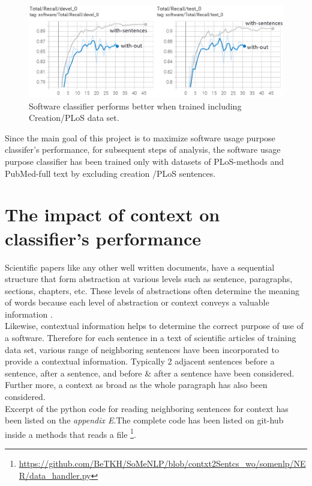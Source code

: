\begin{figure}[htbp]
	\centering
	\includegraphics[width=.90\textwidth]{4.graphics/figures/ch_6/1.with_sent_vs_without/HD/2}
	\caption{Software classifier performs better when trained including Creation/PLoS data set.}
	\label{fig:chapter06:with}
\end{figure}

Since the main goal of this project is to maximize software usage purpose classifer’s performance, for subsequent steps of analysis, the software usage purpose classifier has been trained only with datasets of PLoS-methods and PubMed-full text by excluding creation /PLoS sentences. 

\section{The impact of context on classifier’s performance }
\label{sec:chapter06:context}

Scientific papers like any other well written documents, have a sequential structure that form abstraction at various levels such as sentence, paragraphs, sections, chapters, etc. These levels of abstractions often determine the meaning of words because each level of abstraction or context conveys a valuable information \citep{ghosh2016contextual}. \\

Likewise, contextual information helps to determine the correct purpose of use of a software. Therefore for each sentence in a text of scientific articles of training data set, various range of neighboring sentences have been incorporated to provide a contextual information. Typically 2 adjacent sentences before a sentence, after a sentence, and before \& after a sentence have been considered. Further more, a context as broad as the whole paragraph has also been considered. \\

Excerpt of the python code for reading neighboring sentences for context has been listed on the \emph{appendix E}.The complete code has been listed on git-hub inside a methods that reads a file  \footnote{\url{https://github.com/BeTKH/SoMeNLP/blob/contxt2Sentcs_wo/somenlp/NER/data_handler.py}}. 

